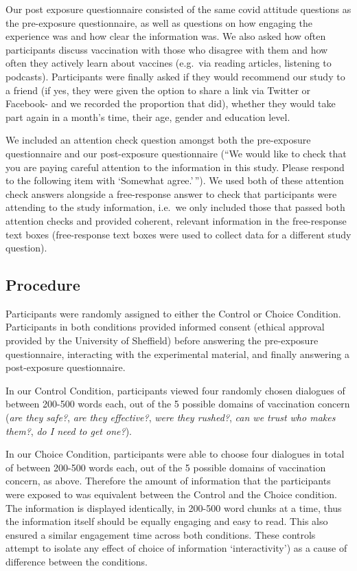 \documentclass[
  english,
  ,jou,floatsintext]{apa6}
\begin{document}
Our post exposure questionnaire consisted of the same covid attitude questions as the pre-exposure questionnaire, as well as questions on how engaging the experience was and how clear the information was. We also asked how often participants discuss vaccination with those who disagree with them and how often they actively learn about vaccines (e.g.~via reading articles, listening to podcasts). Participants were finally asked if they would recommend our study to a friend (if yes, they were given the option to share a link via Twitter or Facebook- and we recorded the proportion that did), whether they would take part again in a month's time, their age, gender and education level.

We included an attention check question amongst both the pre-exposure questionnaire and our post-exposure questionnaire (``We would like to check that you are paying careful attention to the information in this study. Please respond to the following item with `Somewhat agree.'\,''). We used both of these attention check answers alongside a free-response answer to check that participants were attending to the study information, i.e.~we only included those that passed both attention checks and provided coherent, relevant information in the free-response text boxes (free-response text boxes were used to collect data for a different study question).

\hypertarget{procedure}{%
\subsection{Procedure}\label{procedure}}

Participants were randomly assigned to either the Control or Choice Condition. Participants in both conditions provided informed consent (ethical approval provided by the University of Sheffield) before answering the pre-exposure questionnaire, interacting with the experimental material, and finally answering a post-exposure questionnaire.

In our Control Condition, participants viewed four randomly chosen dialogues of between 200-500 words each, out of the 5 possible domains of vaccination concern (\emph{are they safe?}, \emph{are they effective?}, \emph{were they rushed?}, \emph{can we trust who makes them?}, \emph{do I need to get one?}).

In our Choice Condition, participants were able to choose four dialogues in total of between 200-500 words each, out of the 5 possible domains of vaccination concern, as above. Therefore the amount of information that the participants were exposed to was equivalent between the Control and the Choice condition. The information is displayed identically, in 200-500 word chunks at a time, thus the information itself should be equally engaging and easy to read. This also ensured a similar engagement time across both conditions. These controls attempt to isolate any effect of choice of information `interactivity') as a cause of difference between the conditions.
\end{document}

